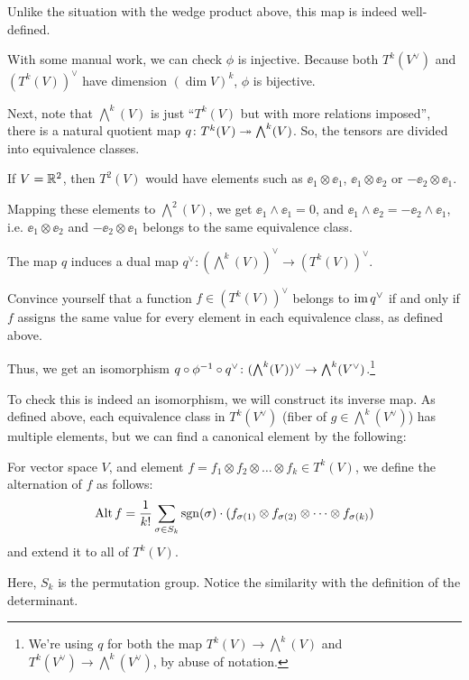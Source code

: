 Unlike the situation with the wedge product above, this map is indeed well-defined.

With some manual work, we can check $\phi$ is injective. Because both $T^k(V^\vee)$ and
$(T^k(V))^\vee$ have dimension $(\dim V)^k$, $\phi$ is bijective.

Next, note that $\bigwedge^k(V)$ is just ``$T^k(V)$ but with more relations imposed'',
there is a natural quotient map $q \colon T^k(V) \twoheadrightarrow \bigwedge^k(V)$.
So, the tensors are divided into equivalence classes.
\begin{example}
	If $V = \mathbb R^2$, then $T^2(V)$ would have elements such as $\ee_1 \otimes \ee_1$, $\ee_1 \otimes
	\ee_2$ or $-\ee_2 \otimes \ee_1$.

	Mapping these elements to $\bigwedge^2(V)$, we get $\ee_1 \wedge \ee_1 = 0$, and $\ee_1 \wedge
	\ee_2 = -\ee_2 \wedge \ee_1$, i.e. $\ee_1 \otimes \ee_2$ and $-\ee_2 \otimes \ee_1$ belongs to
	the same equivalence class.
\end{example}

The map $q$ induces a dual map $q^\vee \colon (\bigwedge^k(V))^\vee \to (T^k(V))^\vee$.
\begin{ques}
	Convince yourself that a function $f \in (T^k(V))^\vee$ belongs to $\operatorname{im} q^\vee$ if and only if
	$f$ assigns the same value for every element in each equivalence class, as defined above.
\end{ques}

Thus, we get an isomorphism $q \circ \phi^{-1} \circ q^\vee \colon (\bigwedge^k(V))^\vee \to
\bigwedge^k(V^\vee)$.\footnote{We're using $q$ for both the map $T^k(V) \to \bigwedge^k(V)$ and
$T^k(V^\vee) \to \bigwedge^k(V^\vee)$, by abuse of notation.}

To check this is indeed an isomorphism, we will construct its inverse map.
As defined above, each equivalence class in $T^k(V^\vee)$ (fiber of $g \in \bigwedge^k(V^\vee)$)
has multiple elements, but we can find a canonical element by the following:
\begin{definition}
	For vector space $V$, and element $f = f_1 \otimes f_2 \otimes \dots \otimes f_k \in T^k(V)$,
	we define the alternation of $f$ as follows:
	\[ \operatorname{Alt} f = \frac{1}{k!} \sum_{\sigma \in S_k} \operatorname{sgn}(\sigma) \cdot
	(f_{\sigma(1)} \otimes f_{\sigma(2)} \otimes \dots \otimes f_{\sigma(k)}) \]
	and extend it to all of $T^k(V)$.
\end{definition}
Here, $S_k$ is the permutation group. Notice the similarity with the definition of the determinant.

